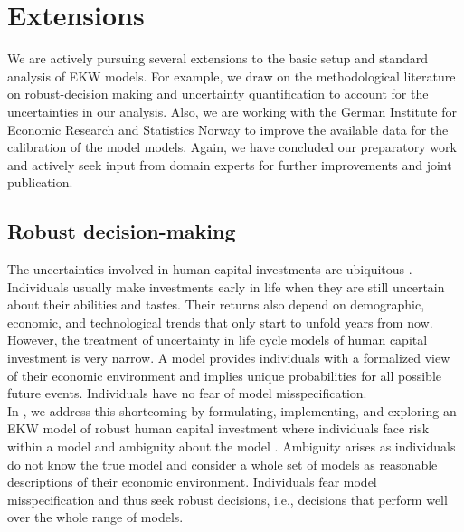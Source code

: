 \section{Extensions}\label{Extensions}
We are actively pursuing several extensions to the basic setup and standard analysis of EKW models. For example, we draw on the methodological literature on robust-decision making and uncertainty quantification to account for the uncertainties in our analysis. Also, we are working with the German Institute for Economic Research and Statistics Norway to improve the available data for the calibration of the model models. Again, we have concluded our preparatory work and actively seek input from domain experts for further improvements and joint publication.
\subsection{Robust decision-making}
The uncertainties involved in human capital investments are ubiquitous \citep{Becker.1964}. Individuals usually make investments early in life when they are still uncertain about their abilities and tastes. Their returns also depend on demographic, economic, and technological trends that only start to unfold years from now. However, the treatment of uncertainty in life cycle models of human capital investment is very narrow. A model provides individuals with a formalized view of their economic environment and implies unique probabilities for all possible future events. Individuals have no fear of model misspecification.\\

\noindent In \citet{Eisenhauer.2020}, we address this shortcoming by formulating, implementing, and exploring an EKW model of robust human capital investment where individuals face risk within a model and ambiguity about the model \citep{Arrow.1951}. Ambiguity arises as individuals do not know the true model and consider a whole set of models as reasonable descriptions of their economic environment. Individuals fear model misspecification and thus seek robust decisions, i.e., decisions that perform well over the whole range of models.\\

